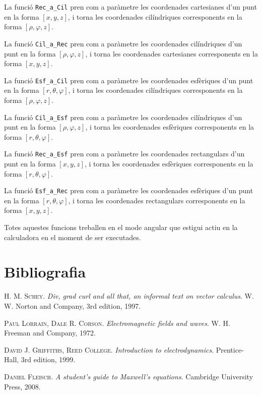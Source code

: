 \documentclass[catalan,a4paper,twoside,11pt]{article}
\begin{document}
La funció \texttt{Rec\_a\_Cil} pren com a paràmetre les coordenades cartesianes d'un punt en la forma $[x,y,z]$, i torna les coordenades cilíndriques corresponents en la forma $[\rho,\varphi,z]$.



La funció \texttt{Cil\_a\_Rec} pren com a paràmetre les coordenades cilíndriques d'un punt en la forma $[\rho,\varphi,z]$, i torna les coordenades cartesianes corresponents en la forma  $[x,y,z]$.


La funció \texttt{Esf\_a\_Cil} pren com a paràmetre les coordenades esfèriques d'un punt en la forma $[r, \theta,\varphi]$, i torna les coordenades cilíndriques corresponents en la forma  $[\rho,\varphi,z]$.


La funció \texttt{Cil\_a\_Esf} pren com a paràmetre les coordenades cilíndriques  d'un punt en la forma $[\rho,\varphi,z]$, i torna les coordenades esfèriques corresponents en la forma $[r,\theta,\varphi]$.


La funció \texttt{Rec\_a\_Esf} pren com a paràmetre les coordenades rectangulars  d'un punt en la forma $[x,y,z]$, i torna les coordenades esfèriques corresponents en la forma $[r,\theta,\varphi]$.


La funció \texttt{Esf\_a\_Rec} pren com a paràmetre les coordenades esfèriques d'un punt en la forma $[r,\theta,\varphi]$, i torna les coordenades rectangulars corresponents en la forma $[x,y,z]$.



Totes aquestes funcions treballen en el mode angular que estigui actiu en la calculadora en el moment de ser executades.



\section{Bibliografia}

\textsc{H. M. Schey}. \textsl{Div, grad curl and all that, an informal text on vector calculus}.  W. W. Norton and Company, 3rd edition, 1997.

\textsc{Paul Lorrain, Dale R. Corson}. \textsl{Electromagnetic fields and waves}.  W. H. Freeman and Company, 1972.

\textsc{David J. Griffiths, Reed College}. \textsl{Introduction to electrodynamics}. Prentice-Hall, 3rd edition, 1999.

\textsc{Daniel Fleisch}. \textsl{A student's guide to Maxwell's equations}. Cambridge University Press, 2008.
\end{document}
